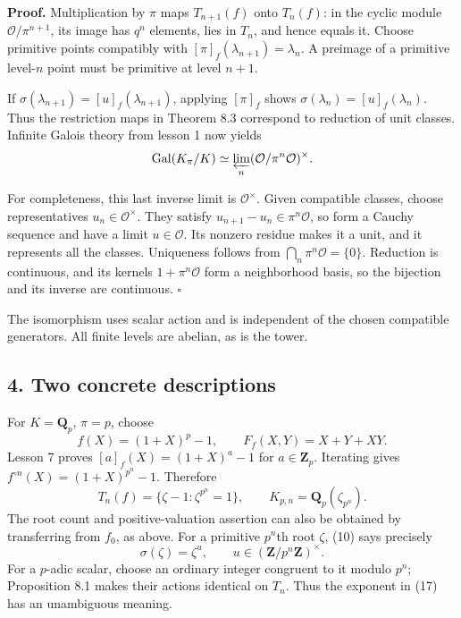 \documentclass[11pt,a4paper]{article}
\begin{document}
\textbf{Proof.} Multiplication by \(\pi\) maps \(T_{n+1}(f)\) onto
\(T_n(f)\): in the cyclic module \(\mathcal O/\pi^{n+1}\), its image has
\(q^n\) elements, lies in \(T_n\), and hence equals it. Choose primitive
points compatibly with \([\pi]_f(\lambda_{n+1})=\lambda_n\). A preimage
of a primitive level-\(n\) point must be primitive at level \(n+1\).

If \(\sigma(\lambda_{n+1})=[u]_{f}(\lambda_{n+1})\), applying
\([\pi]_f\) shows \(\sigma(\lambda_n)=[u]_f(\lambda_n)\). Thus the
restriction maps in Theorem 8.3 correspond to reduction of unit classes.
Infinite Galois theory from lesson 1 now yields \[
\operatorname{Gal}(K_\pi/K)
 \simeq\varprojlim_n(\mathcal O/\pi^n\mathcal O)^\times.
\]

For completeness, this last inverse limit is \(\mathcal O^\times\).
Given compatible classes, choose representatives
\(u_n\in\mathcal O^\times\). They satisfy
\(u_{n+1}-u_n\in\pi^n\mathcal O\), so form a Cauchy sequence and have a
limit \(u\in\mathcal O\). Its nonzero residue makes it a unit, and it
represents all the classes. Uniqueness follows from
\(\bigcap_n\pi^n\mathcal O=\{0\}\). Reduction is continuous, and its
kernels \(1+\pi^n\mathcal O\) form a neighborhood basis, so the
bijection and its inverse are continuous. \(\square\)

The isomorphism uses scalar action and is independent of the chosen
compatible generators. All finite levels are abelian, as is the tower.

\subsection{4. Two concrete
descriptions}\label{two-concrete-descriptions}

For \(K=\mathbf Q_p\), \(\pi=p\), choose \[
f(X)=(1+X)^p-1,\qquad F_f(X,Y)=X+Y+XY.
\] Lesson 7 proves \([a]_f(X)=(1+X)^a-1\) for \(a\in\mathbf Z_p\).
Iterating gives \(f^{\circ n}(X)=(1+X)^{p^n}-1\). Therefore \[
T_n(f)=\{\zeta-1:\zeta^{p^n}=1\},\qquad
K_{p,n}=\mathbf Q_p(\zeta_{p^n}).
\tag{16}
\] The root count and positive-valuation assertion can also be obtained
by transferring from \(f_0\), as above. For a primitive \(p^n\)th root
\(\zeta\), (10) says precisely \[
\sigma(\zeta)=\zeta^u,\qquad u\in(\mathbf Z/p^n\mathbf Z)^\times.
\tag{17}
\] For a \(p\)-adic scalar, choose an ordinary integer congruent to it
modulo \(p^n\); Proposition 8.1 makes their actions identical on
\(T_n\). Thus the exponent in (17) has an unambiguous meaning.
\end{document}

